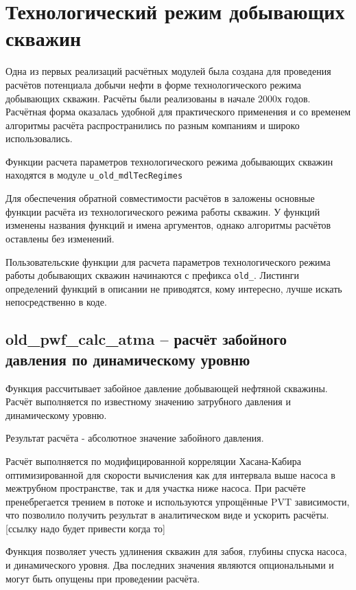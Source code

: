 

\section{Технологический режим добывающих скважин}
Одна из первых реализаций расчётных модулей \unf{} была создана для проведения расчётов потенциала добычи нефти в форме технологического режима добывающих скважин. Расчёты были реализованы в начале 2000х годов. Расчётная форма оказалась удобной для практического применения и со временем алгоритмы расчёта распространились по разным компаниям и широко использовались.

Функции расчета параметров технологического режима добывающих скважин находятся в модуле \texttt{u_old_mdlTecRegimes}

Для обеспечения обратной совместимости расчётов в \unf{} заложены основные функции расчёта из технологического режима работы скважин. У функций изменены названия функций и имена аргументов, однако алгоритмы расчётов оставлены без изменений.

Пользовательские функции для расчета параметров технологического режима работы добывающих скважин начинаются с префикса  \texttt{old_}. Листинги определений функций в описании не приводятся, кому интересно, лучше искать непосредственно в коде.

\newpage
\subsection{old\_pwf\_calc\_atma – расчёт забойного давления по динамическому уровню}

Функция рассчитывает забойное давление добывающей нефтяной скважины. Расчёт выполняется по известному значению затрубного давления и динамическому уровню. \cite{Khasanov_TR_2006}

Результат расчёта - абсолютное значение забойного давления. 

Расчёт выполняется по модифицированной корреляции Хасана-Кабира оптимизированной для скорости вычисления как для интервала выше насоса в межтрубном пространстве, так и для участка ниже насоса. При расчёте пренебрегается трением в потоке и используются упрощённые PVT зависимости, что позволило получить результат в аналитическом виде и ускорить расчёты. [ссылку надо будет привести когда то] 

Функция позволяет учесть удлинения скважин для забоя, глубины спуска насоса, и динамического уровня. Два последних значения являются опциональными и могут быть опущены при проведении расчёта. 


